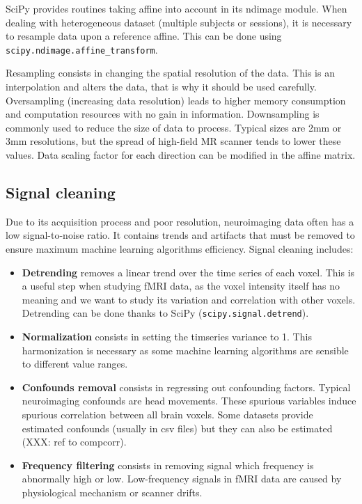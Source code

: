 \documentclass{frontiersSCNS} %
\begin{document}
SciPy provides routines taking affine into account in its ndimage module.
When dealing with heterogeneous dataset (multiple subjects or sessions), it is
necessary to resample data upon a reference affine. This can be done using
\texttt{scipy.ndimage.affine\_transform}.

Resampling consists in changing the spatial resolution of the data. This is
an interpolation and alters the data, that is why it should be used carefully.
Oversampling (increasing data resolution) leads to higher memory consumption
and computation resources with no gain in information.
Downsampling is commonly used to reduce the size of data to process.
Typical sizes are 2mm or 3mm resolutions, but the spread of high-field MR
scanner tends to lower these values.
Data scaling factor for each direction can be modified in the affine matrix.

\subsection{Signal cleaning}

Due to its acquisition process and poor resolution, neuroimaging data often has a low
signal-to-noise ratio. It contains trends and artifacts that must be removed
to ensure maximum machine learning algorithms efficiency. Signal cleaning
includes:
\begin{itemize}
    \item{\bf Detrending} removes a linear trend over the time series of each
        voxel. This is a useful step when studying fMRI data, as the voxel
        intensity itself has no meaning and we want to study its variation and
        correlation with other voxels. Detrending can be done thanks to SciPy
        (\texttt{scipy.signal.detrend}).
    \item{\bf Normalization} consists in setting the timseries variance to 1.
        This harmonization is necessary as some machine learning algorithms are
        sensible to different value ranges.
    \item{\bf Confounds removal} consists in regressing out confounding factors.
        Typical neuroimaging confounds are head movements. These spurious
        variables induce spurious correlation between all brain voxels.
        Some datasets provide estimated confounds (usually in csv files) but
        they can also be estimated (XXX: ref to compcorr).
    \item{\bf Frequency filtering} consists in removing signal which frequency is
        abnormally high or low. Low-frequency signals in fMRI data are caused by
        physiological mechanism or scanner drifts.
\end{itemize}
\end{document}
